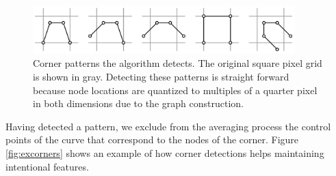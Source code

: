 \documentclass[]{usiinfbachelorproject}
\begin{document}
\begin{figure}[ht]
	\centering
	\includegraphics[width=0.9\textwidth]{img/corners.png}
	\caption{Corner patterns the algorithm detects. The original square pixel grid is shown in gray. Detecting these patterns is straight forward because node locations are quantized to multiples of a quarter pixel in both dimensions due to the graph construction.}
	\label{fig:cornerpattern}
\end{figure}

\noindent Having detected a pattern, we exclude from the averaging process the control points of the curve that correspond to the nodes of the corner. Figure \ref{fig:excorners} shows an example of how corner detections helps maintaining intentional features.
\end{document}
